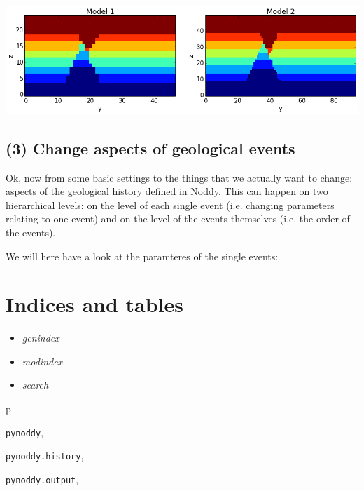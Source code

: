 \documentclass[letterpaper,10pt,english]{sphinxmanual}
\begin{document}
\includegraphics{2-Adjust-input_12_0.png}


\section{(3) Change aspects of geological events}
\label{notebooks/2-Adjust-input:change-aspects-of-geological-events}
Ok, now from some basic settings to the things that we actually want to
change: aspects of the geological history defined in Noddy. This can
happen on two hierarchical levels: on the level of each single event
(i.e. changing parameters relating to one event) and on the level of the
events themselves (i.e. the order of the events).

We will here have a look at the paramteres of the single events:


\chapter{Indices and tables}
\label{index:indices-and-tables}\begin{itemize}
\item {} 
\emph{genindex}

\item {} 
\emph{modindex}

\item {} 
\emph{search}

\end{itemize}


\renewcommand{\indexname}{Python Module Index}
\begin{theindex}
\def\bigletter#1{{\Large\sffamily#1}\nopagebreak\vspace{1mm}}
\bigletter{p}
\item {\texttt{pynoddy}}, \pageref{pynoddy:module-pynoddy}
\item {\texttt{pynoddy.history}}, \pageref{pynoddy:module-pynoddy.history}
\item {\texttt{pynoddy.output}}, \pageref{pynoddy:module-pynoddy.output}
\end{theindex}

\renewcommand{\indexname}{Index}
\printindex
\end{document}
